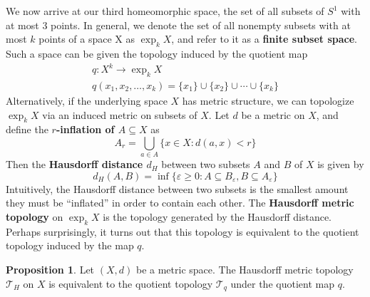 \documentclass[12pt,twoside]{reedthesis}
\theoremstyle{definition}
\newtheorem{prop}[thm]{Proposition}
\newcommand{\defnphrase}[1]{\textbf{#1}}
\begin{document}
We now arrive at our third homeomorphic space, the set of all subsets of $S^1$ with at most 3 points.
In general, we denote the set of all nonempty subsets with at most $k$ points of a space X as $\exp_k X$, and refer to it as a \defnphrase{finite subset space}.
Such a space can be given the topology induced by the quotient map
\begin{gather*}
  q : X^k \to \exp_k X \\
  q(x_1, x_2, \ldots, x_k) = \{x_1\} \cup \{x_2\} \cup \cdots \cup \{x_k\}
\end{gather*}
Alternatively, if the underlying space $X$ has metric structure, we can topologize $\exp_k X$ via an induced metric on subsets of $X$.
Let $d$ be a metric on $X$, and define the \defnphrase{$r$-inflation of $A \subseteq X$} as
\begin{equation*}
  A_r = \bigcup_{a \in A} \{ x \in X : d(a, x) < r \}
\end{equation*}
Then the \defnphrase{Hausdorff distance $d_H$} between two subsets $A$ and $B$ of $X$ is given by
\begin{equation*}
  d_H(A, B) = \inf \{ \varepsilon \geq 0 : A \subseteq B_\varepsilon, B \subseteq A_\varepsilon \}
\end{equation*}
Intuitively, the Hausdorff distance between two subsets is the smallest amount they must be ``inflated'' in order to contain each other.
The \defnphrase{Hausdorff metric topology} on $\exp_k X$ is the topology generated by the Hausdorff distance.
Perhaps surprisingly, it turns out that this topology is equivalent to the quotient topology induced by the map $q$.
\begin{prop}
  Let $(X, d)$ be a metric space.
  The Hausdorff metric topology $\mathcal{T}_H$ on $X$ is equivalent to the quotient topology $\mathcal{T}_q$ under the quotient map $q$.
\end{prop}
\end{document}

